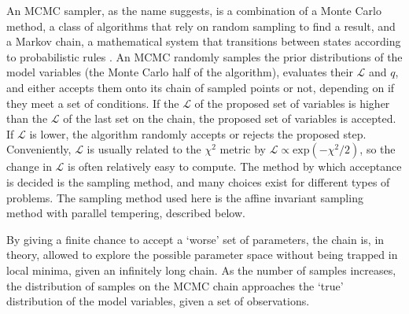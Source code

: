 An MCMC sampler, as the name suggests, is a combination of a Monte Carlo method, a class of algorithms that rely on random sampling to find a result, and a Markov chain, a mathematical system that transitions between states according to probabilistic rules \citep{foreman2012}.
An MCMC randomly samples the prior distributions of the model variables (the Monte Carlo half of the algorithm), evaluates their $\mathcal{L}$ and $q$, and either accepts them onto its chain of sampled points or not, depending on if they meet a set of conditions. If the $\mathcal{L}$ of the proposed set of variables is higher than the $\mathcal{L}$ of the last set on the chain, the proposed set of variables is accepted. If $\mathcal{L}$ is lower, the algorithm randomly accepts or rejects the proposed step.
Conveniently, $\mathcal{L}$ is usually related to the $\chi^2$ metric by $\mathcal{L} \propto \mathrm{exp}(-\chi^2/2)$, so the change in $\mathcal{L}$ is often relatively easy to compute.
The method by which acceptance is decided is the sampling method, and many choices exist for different types of problems. The sampling method used here is the affine invariant sampling method with parallel tempering, described below.

By giving a finite chance to accept a `worse' set of parameters, the chain is, in theory, allowed to explore the possible parameter space without being trapped in local minima, given an infinitely long chain.
As the number of samples increases, the distribution of samples on the MCMC chain approaches the `true' distribution of the model variables, given a set of observations.


